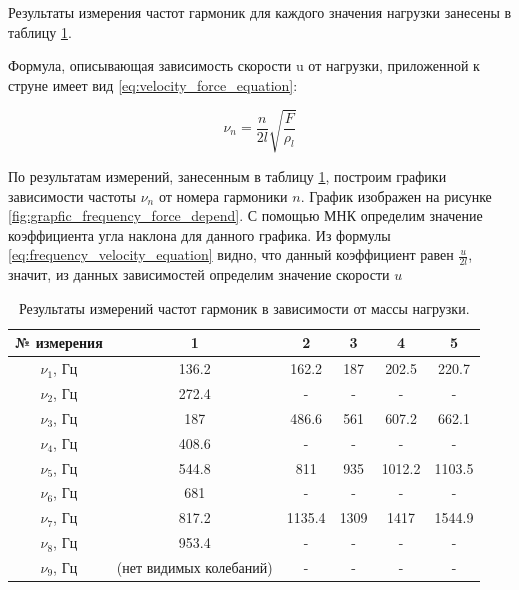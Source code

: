 \documentclass[12pt,a4paper]{article}
\begin{document}
Результаты измерения частот гармоник для каждого значения нагрузки занесены в таблицу \ref{tab:measuring_results}.

Формула, описывающая зависимость скорости u от нагрузки, приложенной к струне имеет вид \ref{eq:velocity_force_equation}:

\begin{equation}
	\nu_{n} = \frac{n}{2l} \sqrt{\frac{F}{\rho_{l}}}
	\label{eq:velocity_force_equation}
\end{equation}

По результатам измерений, занесенным в таблицу \ref{tab:measuring_results}, построим графики зависимости частоты $\nu_{n}$ от номера гармоники $n$. График изображен на рисунке \ref{fig:grapfic_frequency_force_depend}. С помощью МНК определим значение коэффициента угла наклона для данного графика. Из формулы \ref{eq:frequency_velocity_equation} видно, что данный коэффициент равен $\frac{u}{2l}$, значит, из данных зависимостей определим значение скорости $u$

\begin{table}[h!]
\centering
\begin{tabular}{|c|c|c|c|c|c|}
\hline
№ измерения        & 1        & 2        & 3        & 4        & 5        \\ \hline
$\nu_{1}$, Гц      & 136.2    & 162.2    & 187      & 202.5    & 220.7    \\ \hline
$\nu_{2}$, Гц      & 272.4    & -        & -        & -        & -        \\ \hline
$\nu_{3}$, Гц      & 187      & 486.6    & 561      & 607.2    & 662.1    \\ \hline
$\nu_{4}$, Гц      & 408.6    & -        & -        & -        & -        \\ \hline
$\nu_{5}$, Гц      & 544.8    & 811      & 935      & 1012.2   & 1103.5   \\ \hline
$\nu_{6}$, Гц      & 681      & -        & -        & -        & - 		  \\ \hline
$\nu_{7}$, Гц      & 817.2    & 1135.4   & 1309     & 1417     & 1544.9   \\ \hline
$\nu_{8}$, Гц      & 953.4    & -        & -        & -        & -        \\ \hline
$\nu_{9}$, Гц      & (нет видимых колебаний)        & -        & -        & -        & -        \\ \hline
\end{tabular}

\caption{Результаты измерений частот гармоник в зависимости от массы нагрузки.}
\label{tab:measuring_results}
\end{table}
\end{document}
